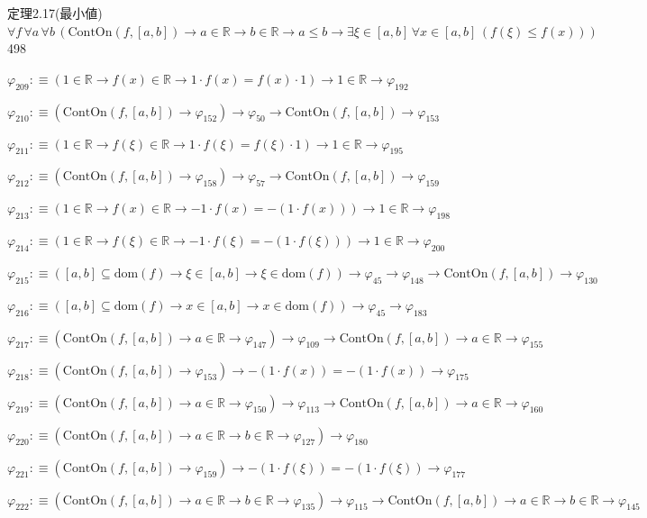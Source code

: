 \begin{fullproof}{定理2.17(最小値)}{$\forall f\,\forall a\,\forall b\,(\mathrm{ContOn}(f,[a,b]) \to a \in \mathbb{R} \to b \in \mathbb{R} \to a \leq b \to \exists \xi \in [a,b]\,\forall x \in [a,b]\,(f(\xi) \leq f(x)))$}{498}
\begin{abbrevlist}
\item $\varphi_{209} :\equiv (1 \in \mathbb{R} \to f(x) \in \mathbb{R} \to 1 \cdot f(x) = f(x) \cdot 1) \to 1 \in \mathbb{R} \to \varphi_{192}$
\item $\varphi_{210} :\equiv (\mathrm{ContOn}(f,[a,b]) \to \varphi_{152}) \to \varphi_{50} \to \mathrm{ContOn}(f,[a,b]) \to \varphi_{153}$
\item $\varphi_{211} :\equiv (1 \in \mathbb{R} \to f(\xi) \in \mathbb{R} \to 1 \cdot f(\xi) = f(\xi) \cdot 1) \to 1 \in \mathbb{R} \to \varphi_{195}$
\item $\varphi_{212} :\equiv (\mathrm{ContOn}(f,[a,b]) \to \varphi_{158}) \to \varphi_{57} \to \mathrm{ContOn}(f,[a,b]) \to \varphi_{159}$
\item $\varphi_{213} :\equiv (1 \in \mathbb{R} \to f(x) \in \mathbb{R} \to -1 \cdot f(x) = -(1 \cdot f(x))) \to 1 \in \mathbb{R} \to \varphi_{198}$
\item $\varphi_{214} :\equiv (1 \in \mathbb{R} \to f(\xi) \in \mathbb{R} \to -1 \cdot f(\xi) = -(1 \cdot f(\xi))) \to 1 \in \mathbb{R} \to \varphi_{200}$
\item $\varphi_{215} :\equiv ([a,b] \subseteq \mathrm{dom}(f) \to \xi \in [a,b] \to \xi \in \mathrm{dom}(f)) \to \varphi_{45} \to \varphi_{148} \to \mathrm{ContOn}(f,[a,b]) \to \varphi_{130}$
\item $\varphi_{216} :\equiv ([a,b] \subseteq \mathrm{dom}(f) \to x \in [a,b] \to x \in \mathrm{dom}(f)) \to \varphi_{45} \to \varphi_{183}$
\item $\varphi_{217} :\equiv (\mathrm{ContOn}(f,[a,b]) \to a \in \mathbb{R} \to \varphi_{147}) \to \varphi_{109} \to \mathrm{ContOn}(f,[a,b]) \to a \in \mathbb{R} \to \varphi_{155}$
\item $\varphi_{218} :\equiv (\mathrm{ContOn}(f,[a,b]) \to \varphi_{153}) \to -(1 \cdot f(x)) = -(1 \cdot f(x)) \to \varphi_{175}$
\item $\varphi_{219} :\equiv (\mathrm{ContOn}(f,[a,b]) \to a \in \mathbb{R} \to \varphi_{150}) \to \varphi_{113} \to \mathrm{ContOn}(f,[a,b]) \to a \in \mathbb{R} \to \varphi_{160}$
\item $\varphi_{220} :\equiv (\mathrm{ContOn}(f,[a,b]) \to a \in \mathbb{R} \to b \in \mathbb{R} \to \varphi_{127}) \to \varphi_{180}$
\item $\varphi_{221} :\equiv (\mathrm{ContOn}(f,[a,b]) \to \varphi_{159}) \to -(1 \cdot f(\xi)) = -(1 \cdot f(\xi)) \to \varphi_{177}$
\item $\varphi_{222} :\equiv (\mathrm{ContOn}(f,[a,b]) \to a \in \mathbb{R} \to b \in \mathbb{R} \to \varphi_{135}) \to \varphi_{115} \to \mathrm{ContOn}(f,[a,b]) \to a \in \mathbb{R} \to b \in \mathbb{R} \to \varphi_{145}$

\end{abbrevlist}
\end{fullproof}
